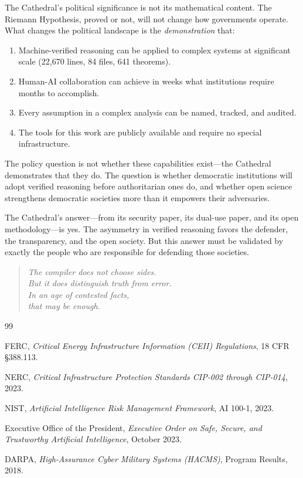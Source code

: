 \documentclass[11pt,a4paper]{article}
\begin{document}
The Cathedral's political significance is not its mathematical
content. The Riemann Hypothesis, proved or not, will not change
how governments operate. What changes the political landscape is
the \emph{demonstration} that:

\begin{enumerate}
  \item Machine-verified reasoning can be applied to complex systems
    at significant scale (22,670 lines, 84 files, 641 theorems).
  \item Human-AI collaboration can achieve in weeks what
    institutions require months to accomplish.
  \item Every assumption in a complex analysis can be named,
    tracked, and audited.
  \item The tools for this work are publicly available and require
    no special infrastructure.
\end{enumerate}

The policy question is not whether these capabilities exist---the
Cathedral demonstrates that they do. The question is whether
democratic institutions will adopt verified reasoning before
authoritarian ones do, and whether open science strengthens
democratic societies more than it empowers their adversaries.

The Cathedral's answer---from its security paper, its dual-use
paper, and its open methodology---is yes. The asymmetry in
verified reasoning favors the defender, the transparency, and
the open society. But this answer must be validated by exactly
the people who are responsible for defending those societies.

\begin{quote}
\emph{The compiler does not choose sides.\\
But it does distinguish truth from error.\\
In an age of contested facts,\\
that may be enough.}
\end{quote}

\begin{thebibliography}{99}

FERC, \emph{Critical Energy Infrastructure Information (CEII)
Regulations}, 18 CFR \S 388.113.

NERC, \emph{Critical Infrastructure Protection Standards
CIP-002 through CIP-014}, 2023.

NIST, \emph{Artificial Intelligence Risk Management Framework},
AI 100-1, 2023.

Executive Office of the President, \emph{Executive Order on Safe,
Secure, and Trustworthy Artificial Intelligence}, October 2023.

DARPA, \emph{High-Assurance Cyber Military Systems (HACMS)},
Program Results, 2018.

\end{thebibliography}
\end{document}
